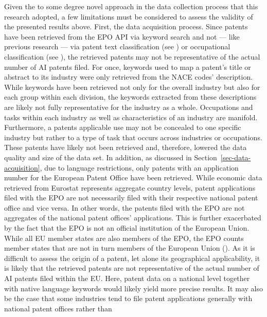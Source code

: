 \documentclass[
  12pt,
  a4paperpaper,
]{article}
\begin{document}
Given the to some degree novel approach in the data collection process
that this research adopted, a few limitations must be considered to
assess the validity of the presented results above. First, the data
acquisition process. Since patents have been retrieved from the EPO API
via keyword search and not --- like previous research --- via patent
text classification (see ) or occupational classification (see
), the retrieved
patents may not be representative of the actual number of AI patents
filed. For once, keywords used to map a patent's title or abstract to
its industry were only retrieved from the NACE codes' description. While
keywords have been retrieved not only for the overall industry but also
for each group within each division, the keywords extracted from these
descriptions are likely not fully representative for the industry as a
whole. Occupations and tasks within each industry as well as
characteristics of an industry are manifold. Furthermore, a patents
applicable use may not be concealed to one specific industry but rather
to a type of task that occurs across industries or occupations. These
patents have likely not been retrieved and, therefore, lowered the data
quality and size of the data set. In addition, as discussed in
Section~\ref{sec-data-acquisition}, due to language restrictions, only
patents with an application number for the European Patent Office have
been retrieved. While economic data retrieved from Eurostat represents
aggregate country levels, patent applications filed with the EPO are not
necessarily filed with their respective national patent office and vice
versa. In other words, the patents filed with the EPO are not aggregates
of the national patent offices' applications. This is further
exacerbated by the fact that the EPO is not an official institution of
the European Union. While all EU member states are also members of the
EPO, the EPO counts member states that are not in turn members of the
European Union
(). As it is difficult to assess the origin of a patent,
let alone its geographical applicability, it is likely that the
retrieved patents are not representative of the actual number of AI
patents filed within the EU. Here, patent data on a national level
together with native language keywords would likely yield more precise
results. It may also be the case that some industries tend to file
patent applications generally with national patent offices rather than
\end{document}
